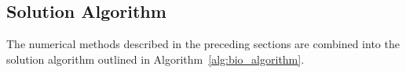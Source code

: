 

\subsection{Solution Algorithm}
The numerical methods described in the preceding sections are combined into the solution algorithm outlined in Algorithm~\ref{alg:bio_algorithm}.
